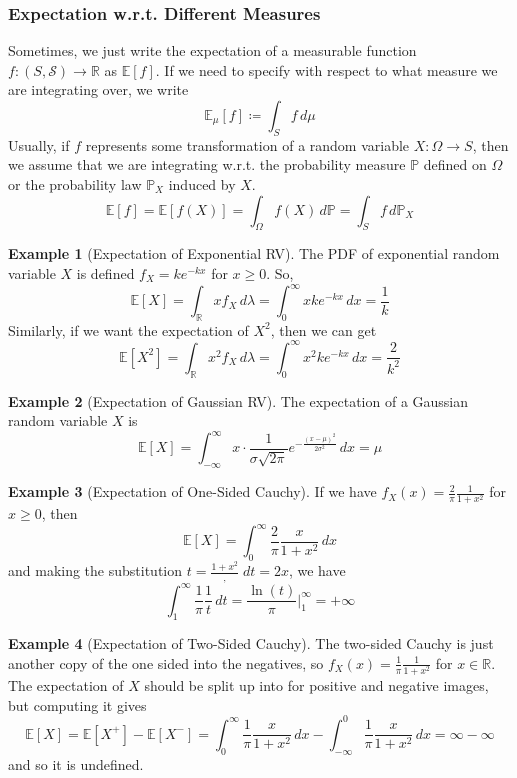 \documentclass{article}
\theoremstyle{definition}
\newtheorem{example}{Example}[section]
\theoremstyle{remark}
\theoremstyle{definition}
\begin{document}
\subsubsection{Expectation w.r.t. Different Measures}
Sometimes, we just write the expectation of a measurable function $f: (S, \mathcal{S}) \rightarrow \mathbb{R}$ as $\mathbb{E}[f]$. If we need to specify with respect to what measure we are integrating over, we write 
\[\mathbb{E}_\mu [f] \coloneqq \int_S f \, d\mu\]
Usually, if $f$ represents some transformation of a random variable $X: \Omega \rightarrow S$, then we assume that we are integrating w.r.t. the probability measure $\mathbb{P}$ defined on $\Omega$ or the probability law $\mathbb{P}_X$ induced by $X$. 
\[\mathbb{E}[f] = \mathbb{E}[f(X)] = \int_\Omega f(X) \,d\mathbb{P} = \int_S f \,d\mathbb{P}_X\]

\begin{example}[Expectation of Exponential RV]
The PDF of exponential random variable $X$ is defined $f_X = k e^{-k x}$ for $x \geq 0$. So, 
\[\mathbb{E}[X] = \int_\mathbb{R} x f_X \, d\lambda = \int_0^\infty x k e^{-k x} \, dx = \frac{1}{k}\]
Similarly, if we want the expectation of $X^2$, then we can get 
\[\mathbb{E}[X^2] = \int_\mathbb{R} x^2 f_X \,d\lambda = \int_0^\infty x^2 k e^{-k x} \,dx = \frac{2}{k^2}\]
\end{example} 

\begin{example}[Expectation of Gaussian RV]
The expectation of a Gaussian random variable $X$ is
\[\mathbb{E}[X] = \int_{-\infty}^\infty x \cdot \frac{1}{\sigma \sqrt{2\pi}} e^{-\frac{(x - \mu)^2}{2 \sigma^2}} \, dx = \mu\]
\end{example}

\begin{example}[Expectation of One-Sided Cauchy]
If we have $f_X (x) = \frac{2}{\pi} \frac{1}{1 + x^2}$ for $x \geq 0$, then 
\[\mathbb{E}[X] = \int_0^\infty \frac{2}{\pi} \frac{x}{1 + x^2} \,dx\]
and making the substitution $t = \frac{1 + x^2}, \; dt = 2x$, we have 
\[\int_1^\infty \frac{1}{\pi} \frac{1}{t} \,dt = \frac{\ln(t)}{\pi} \bigg|_1^\infty = +\infty\]
\end{example}

\begin{example}[Expectation of Two-Sided Cauchy]
The two-sided Cauchy is just another copy of the one sided into the negatives, so $f_X (x) = \frac{1}{\pi} \frac{1}{1 + x^2}$ for $x \in \mathbb{R}$. The expectation of $X$ should be split up into for positive and negative images, but computing it gives 
\[\mathbb{E}[X] = \mathbb{E}[X^+] - \mathbb{E}[X^-] = \int_0^\infty \frac{1}{\pi} \frac{x}{1 + x^2}\,dx - \int_{-\infty}^0 \frac{1}{\pi} \frac{x}{1 + x^2}\,dx = \infty - \infty\]
and so it is undefined. 
\end{example}
\end{document}
